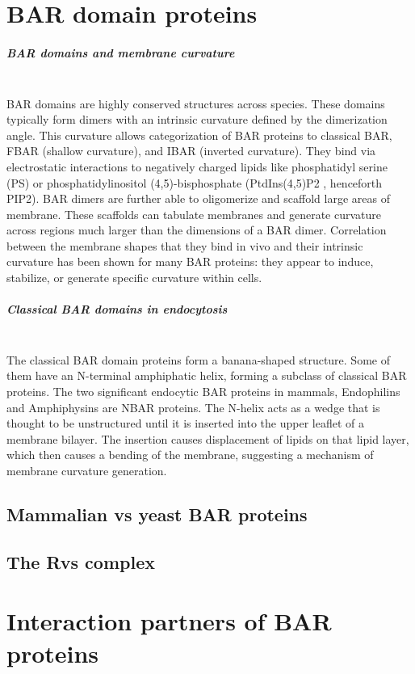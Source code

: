 		
	\section{BAR domain proteins}
		\subparagraph{BAR domains and membrane curvature}
\mbox{} \\
BAR domains are highly conserved structures across species. These domains typically form dimers with an intrinsic curvature defined by the dimerization angle. This curvature allows categorization of BAR proteins to classical BAR, FBAR (shallow curvature), and IBAR (inverted curvature). They bind via electrostatic interactions to negatively charged lipids like phosphatidyl serine (PS) or phosphatidylinositol (4,5)-bisphosphate (PtdIns(4,5)P2 , henceforth PIP2). BAR dimers are further able to oligomerize and scaffold large areas of membrane. These scaffolds can tabulate membranes and generate curvature across regions much larger than the dimensions of a BAR dimer. Correlation between the membrane shapes that they bind in vivo and their intrinsic curvature has been shown for many BAR proteins: they appear to induce, stabilize, or generate specific curvature within cells. 

		\subparagraph{Classical BAR domains in endocytosis}
\mbox{} \\
The classical BAR domain proteins form a banana-shaped structure. Some of them have an N-terminal amphiphatic helix, forming a subclass of classical BAR proteins. The two significant endocytic BAR proteins in mammals, Endophilins and Amphiphysins are NBAR proteins. The N-helix acts as a wedge that is thought to be unstructured until it is inserted into the upper leaflet of a membrane bilayer. The insertion causes displacement of lipids on that lipid layer, which then causes a bending of the membrane, suggesting a mechanism of membrane curvature generation. 

		\subsection{Mammalian vs yeast BAR proteins}
		\subsection{The Rvs complex}		
		
		
	\section{Interaction partners of BAR proteins}
